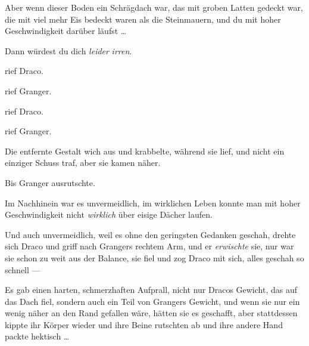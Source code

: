 Aber wenn dieser Boden ein Schrägdach war, das mit groben Latten gedeckt war, die mit viel mehr Eis bedeckt waren als die Steinmauern, und du mit hoher Geschwindigkeit darüber läufst …

Dann würdest du dich \emph{leider} \emph{irren}.

 rief Draco.

 rief Granger.

 rief Draco.

 rief Granger.

Die entfernte Gestalt wich aus und krabbelte, während sie lief, und nicht ein einziger Schuss traf, aber sie kamen näher.

Bis Granger ausrutschte.

Im Nachhinein war es unvermeidlich, im wirklichen Leben konnte man mit hoher Geschwindigkeit nicht \emph{wirklich} über eisige Dächer laufen.

Und auch unvermeidlich, weil es ohne den geringsten Gedanken geschah, drehte sich Draco und griff nach Grangers rechtem Arm, und er \emph{erwischte} sie, nur war sie schon zu weit aus der Balance, sie fiel und zog Draco mit sich, alles geschah so schnell —

Es gab einen harten, schmerzhaften Aufprall, nicht nur Dracos Gewicht, das auf das Dach fiel, sondern auch ein Teil von Grangers Gewicht, und wenn sie nur ein wenig näher an den Rand gefallen wäre, hätten sie es geschafft, aber stattdessen kippte ihr Körper wieder und ihre Beine rutschten ab und ihre andere Hand packte hektisch …


